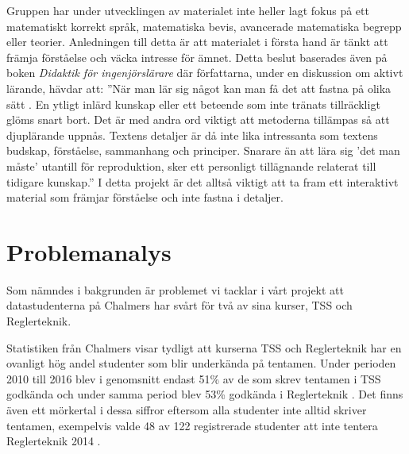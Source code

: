 \documentclass[12pt,a4paper,twoside,openright]{article}
\begin{document}
Gruppen har under utvecklingen av materialet inte heller lagt fokus på
ett matematiskt korrekt språk, matematiska bevis, avancerade matematiska
begrepp eller teorier. Anledningen till detta är att materialet i
första hand är tänkt att främja förståelse och väcka intresse för
ämnet. Detta beslut baserades även på boken \textit{Didaktik för
 ingenjörslärare} där författarna, under en diskussion om aktivt
lärande, hävdar att: ”När man lär sig något kan man få det att fastna
på olika sätt \cite{didaktik_for_ingenjorslarare}. En ytligt inlärd kunskap eller ett beteende som inte
tränats tillräckligt glöms snart bort. Det är med andra ord viktigt
att metoderna tillämpas så att djuplärande uppnås. Textens detaljer är
då inte lika intressanta som textens budskap, förståelse, sammanhang
och principer. Snarare än att lära sig 'det man måste' utantill för
reproduktion, sker ett personligt tillägnande relaterat till tidigare
kunskap.” I detta projekt är det alltså viktigt att ta fram ett
interaktivt material som främjar förståelse och inte fastna i
detaljer.

\section{Problemanalys}


Som nämndes i bakgrunden är problemet vi tacklar i vårt projekt att
datastudenterna på Chalmers har svårt för två av sina kurser, TSS och
Reglerteknik.

Statistiken från Chalmers visar tydligt att kurserna TSS och
Reglerteknik har en ovanligt hög andel studenter som blir
underkända på tentamen. Under perioden 2010 till 2016 blev i genomsnitt
endast 51\% av de som skrev tentamen i TSS godkända och under samma
period blev 53\% godkända i Reglerteknik \cite{tentastatistik}.
Det finns även ett mörkertal i dessa siffror eftersom alla studenter
inte alltid skriver tentamen, exempelvis valde 48 av 122 registrerade
studenter att inte tentera Reglerteknik 2014
\cite{kursinformation:ere102:14-15}.
\end{document}
